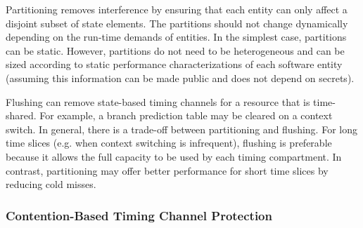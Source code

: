 Partitioning removes interference by ensuring that each entity can
only affect a disjoint subset of state elements. The partitions
should not change dynamically depending on the run-time demands of entities.
In the simplest case, partitions can be static.
However, partitions do not need to be heterogeneous and can be sized according 
to static performance characterizations of each software entity (assuming this 
information can be made public and does not depend on secrets).


Flushing can remove state-based timing channels for a resource that is time-shared.
For example, a branch prediction table may be cleared on a context switch.
In general, there is a trade-off between partitioning and flushing.
For long time slices (e.g. when context switching is infrequent), 
flushing is preferable because it allows the full capacity to be used by
each timing compartment. In contrast, partitioning may
offer better performance for short time slices by reducing cold misses.

\subsubsection{Contention-Based Timing Channel Protection}

